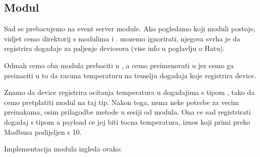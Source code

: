 \documentclass[letterpaper,10pt,croatian]{sphinxmanual}
\begin{document}
\subsection{Modul}
\label{\detokenize{03-hat-modbus-workshop/index:modul}}
\noindent{}

\sphinxAtStartPar
Sad se prebacujemo na event server module. Ako pogledamo koji moduli postoje,
vidjet cemo direktorij  s modulima  i
.  mozemo ignorirati, njegova svrha je da
registrira dogadaje za paljenje deviceova (vise info u poglavlju o Hatu).

\sphinxAtStartPar
Odmah cemo oba modula prebaciti u , a  cemo
preimenovati u  jer cemo ga preinaciti u to da racuna
temperaturu na temelju dogadaja koje registrira device.

\sphinxAtStartPar
Znamo da device registrira ocitanja temperatura u dogadajima s tipom
, tako da
cemo pretplatiti modul na taj tip. Nakon toga, nema neke potrebe za vecim
preinakama, osim prilagodbe  metode u sesiji od modula. Ona ce sad
registrirati dogadaj s tipom  a payload ce joj biti tocna
temperatura, iznos koji primi preko Modbusa podijeljen s 10.

\sphinxAtStartPar
Implementacija modula izgleda ovako:
\end{document}
